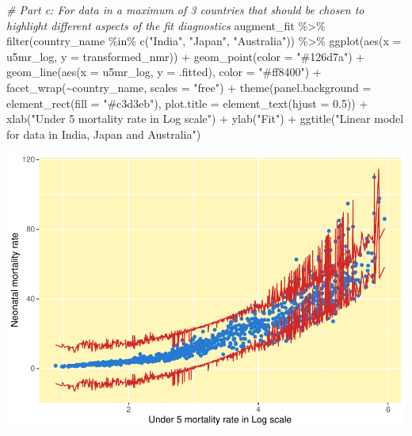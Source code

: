 \documentclass[
]{article}
\newenvironment{Shaded}{\begin{snugshade}}{\end{snugshade}}
\newcommand{\AttributeTok}[1]{\textcolor[rgb]{0.77,0.63,0.00}{#1}}
\newcommand{\CommentTok}[1]{\textcolor[rgb]{0.56,0.35,0.01}{\textit{#1}}}
\newcommand{\FloatTok}[1]{\textcolor[rgb]{0.00,0.00,0.81}{#1}}
\newcommand{\FunctionTok}[1]{\textcolor[rgb]{0.00,0.00,0.00}{#1}}
\newcommand{\NormalTok}[1]{#1}
\newcommand{\SpecialCharTok}[1]{\textcolor[rgb]{0.00,0.00,0.00}{#1}}
\newcommand{\StringTok}[1]{\textcolor[rgb]{0.31,0.60,0.02}{#1}}
\begin{document}
\begin{Shaded}
\begin{Highlighting}[]
\CommentTok{\# Part c: For data in a maximum of 3 countries that should be chosen to highlight different aspects of the fit diagnostics}
\NormalTok{augment\_fit }\SpecialCharTok{\%\textgreater{}\%}
  \FunctionTok{filter}\NormalTok{(country\_name }\SpecialCharTok{\%in\%} \FunctionTok{c}\NormalTok{(}\StringTok{"India"}\NormalTok{, }\StringTok{"Japan"}\NormalTok{, }\StringTok{"Australia"}\NormalTok{)) }\SpecialCharTok{\%\textgreater{}\%}
  \FunctionTok{ggplot}\NormalTok{(}\FunctionTok{aes}\NormalTok{(}\AttributeTok{x =}\NormalTok{ u5mr\_log, }\AttributeTok{y =}\NormalTok{ transformed\_nmr)) }\SpecialCharTok{+}
  \FunctionTok{geom\_point}\NormalTok{(}\AttributeTok{color =} \StringTok{"\#126d7a"}\NormalTok{) }\SpecialCharTok{+}
  \FunctionTok{geom\_line}\NormalTok{(}\FunctionTok{aes}\NormalTok{(}\AttributeTok{x =}\NormalTok{ u5mr\_log, }\AttributeTok{y =}\NormalTok{ .fitted), }\AttributeTok{color =} \StringTok{"\#ff8400"}\NormalTok{) }\SpecialCharTok{+}
  \FunctionTok{facet\_wrap}\NormalTok{(}\SpecialCharTok{\textasciitilde{}}\NormalTok{country\_name, }\AttributeTok{scales =} \StringTok{"free"}\NormalTok{) }\SpecialCharTok{+}
  \FunctionTok{theme}\NormalTok{(}\AttributeTok{panel.background =} \FunctionTok{element\_rect}\NormalTok{(}\AttributeTok{fill =} \StringTok{"\#c3d3eb"}\NormalTok{),}
        \AttributeTok{plot.title =} \FunctionTok{element\_text}\NormalTok{(}\AttributeTok{hjust =} \FloatTok{0.5}\NormalTok{)) }\SpecialCharTok{+}
  \FunctionTok{xlab}\NormalTok{(}\StringTok{"Under 5 mortality rate in Log scale"}\NormalTok{) }\SpecialCharTok{+}
  \FunctionTok{ylab}\NormalTok{(}\StringTok{"Fit"}\NormalTok{) }\SpecialCharTok{+}
  \FunctionTok{ggtitle}\NormalTok{(}\StringTok{"Linear model for data in India, Japan and Australia"}\NormalTok{)}
\end{Highlighting}
\end{Shaded}

\includegraphics{A2_files/figure-latex/unnamed-chunk-8-1.pdf}
\end{document}
